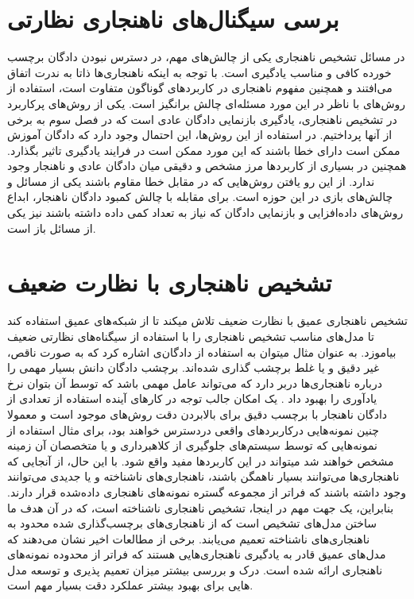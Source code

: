 \documentclass[12pt,a4paper]{report}
\theoremstyle{definition}
\theoremstyle{definition}
\begin{document}
	\section{برسی سیگنال‌‌های ناهنجاری نظارتی}
در مسائل تشخیص ناهنجاری یکی از چالش‌های مهم، در دسترس نبودن دادگان برچسب خورده کافی و مناسب یادگیری است. با توجه به اینکه ناهنجاری‌ها ذاتا به ندرت اتفاق می‌افتند و همچنین مفهوم ناهنجاری در کاربرد‌های گوناگون متفاوت است، استفاده از روش‌های با ناظر در این مورد مسئله‌ای چالش برانگیز است. یکی از روش‌های پرکاربرد در تشخیص ناهنجاری، یادگیری بازنمایی دادگان عادی است که در فصل سوم به برخی از آنها پرداختیم. در استفاده از این روش‌ها، این احتمال وجود دارد که دادگان آموزش ممکن است دارای خطا باشند که این مورد ممکن است در فرایند یادگیری تاثیر بگذارد. همچنین در بسیاری از کاربرد‌ها مرز مشخص و دقیقی میان دادگان عادی و ناهنجار وجود ندارد. از این رو یافتن روش‌هایی که در مقابل خطا مقاوم باشند یکی از مسائل و چالش‌های بازی در این حوزه است. برای مقابله با چالش کمبود دادگان ناهنجار، ابداع روش‌های داده‌افزایی و بازنمایی دادگان که نیاز به تعداد کمی داده داشته باشند نیز یکی از مسائل باز است. 
\section{تشخیص ناهنجاری با نظارت ضعیف}
تشخیص ناهنجاری عمیق با نظارت ضعیف\cite{tian2021weakly, https://doi.org/10.48550/arxiv.1910.13601} تلاش میکند تا از شبکه‌های عمیق استفاده کند تا مدل‌های مناسب تشخیص ناهنجاری را با استفاده از سیگناه‌های نظارتی ضعیف بیاموزد. به عنوان مثال میتوان به استفاده از دادگان‌ی اشاره کرد که به صورت ناقص، غیر دقیق و یا غلط برچشب گذاری شده‌اند. برچشب دادگان دانش بسیار مهمی را درباره ناهنجاری‌ها دربر دارد که می‌تواند عامل مهمی باشد که توسط آن بتوان نرخ‌ یادآوری را بهبود داد \cite{0e1339c0e4924d93b1695af2f9e3e03c, https://doi.org/10.48550/arxiv.1910.13601, tian2021weakly, Sultani_2018_CVPR}. یک امکان جالب توجه در کار‌های آینده استفاده از تعدادی از دادگان ناهنجار با برچسب دقیق برای بالابردن دقت روش‌های موجود است و معمولا چنین نمونه‌هایی درکاربرد‌های واقعی دردسترس خواهند بود، برای مثال استفاده از نمونه‌هایی که توسط سیستم‌های جلوگیری از کلاهبرداری و یا متخصصان آن زمینه مشخص خواهند شد میتواند در این کاربرد‌ها مفید واقع شود. با این حال، از آنجایی که ناهنجاری‌ها می‌توانند بسیار ناهمگن باشند، ناهنجاری‌های ناشناخته و یا جدیدی می‌توانند وجود داشته باشند که فراتر از مجموعه گستره نمونه‌های ناهنجاری داده‌شده قرار دارند. بنابراین، یک جهت مهم در اینجا، تشخیص ناهنجاری ناشناخته است، که در آن هدف ما ساختن مدل‌های تشخیص است که از ناهنجاری‌های برچسب‌گذاری شده محدود به ناهنجاری‌های ناشناخته تعمیم می‌یابند. برخی از مطالعات اخیر\cite{Pang_2021, https://doi.org/10.48550/arxiv.1910.13601, pang2019deep, https://doi.org/10.48550/arxiv.1906.02694} نشان می‌دهند که مدل‌های عمیق قادر به یادگیری ناهنجاری‌هایی هستند که فراتر از محدوده نمونه‌های ناهنجاری ارائه شده است. درک و بررسی بیشتر میزان تعمیم پذیری و توسعه مدل هایی برای بهبود بیشتر عملکرد دقت بسیار مهم است. \\
\end{document}
